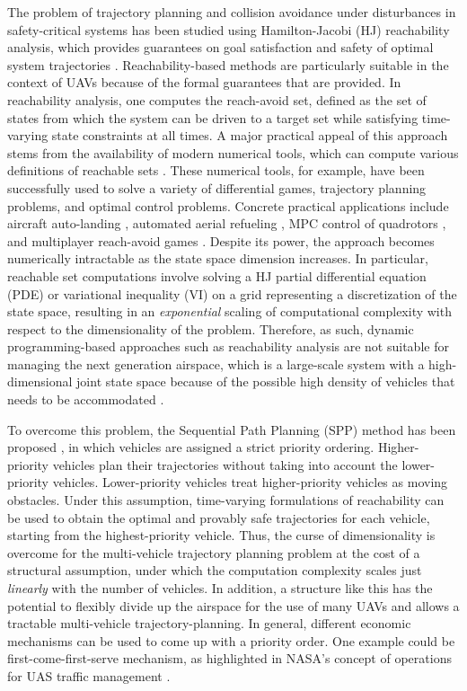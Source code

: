 The problem of trajectory planning and collision avoidance under disturbances in safety-critical systems has been studied using Hamilton-Jacobi (HJ) reachability analysis, which provides guarantees on goal satisfaction and safety of optimal system trajectories \cite{Barron90, Mitchell05, Bokanowski10, Bokanowski11, Margellos11, Fisac15}. Reachability-based methods are particularly suitable in the context of UAVs because of the formal guarantees that are provided. In reachability analysis, one computes the reach-avoid set, defined as the set of states from which the system can be driven to a target set while satisfying time-varying state constraints at all times. A major practical appeal of this approach stems from the availability of modern numerical tools, which can compute various definitions of reachable sets \cite{Sethian96, Osher02, Mitchell02, Mitchell07b}. These numerical tools, for example, have been successfully used to solve a variety of differential games, trajectory planning problems, and optimal control problems. Concrete practical applications include aircraft auto-landing \cite{Bayen07}, automated aerial refueling \cite{Ding08}, MPC control of quadrotors \cite{Bouffard12}, and multiplayer reach-avoid games \cite{Huang11}. Despite its power, the approach becomes numerically intractable as the state space dimension increases. In particular, reachable set computations involve solving a HJ partial differential equation (PDE) or variational inequality (VI) on a grid representing a discretization of the state space, resulting in an \textit{exponential} scaling of computational complexity with respect to the dimensionality of the problem. Therefore, as such, dynamic programming-based approaches such as reachability analysis are not suitable for managing the next generation airspace, which is a large-scale system with a high-dimensional joint state space because of the possible high density of vehicles that needs to be accommodated \cite{Kopardekar16}.  

To overcome this problem, the Sequential Path Planning (SPP) method has been proposed \cite{Chen15c}, in which vehicles are assigned a strict priority ordering. Higher-priority vehicles plan their trajectories without taking into account the lower-priority vehicles. Lower-priority vehicles treat higher-priority vehicles as moving obstacles. Under this assumption, time-varying formulations of reachability \cite{Bokanowski11, Fisac15} can be used to obtain the optimal and provably safe trajectories for each vehicle, starting from the highest-priority vehicle. Thus, the curse of dimensionality is overcome for the multi-vehicle trajectory planning problem at the cost of a structural assumption, under which the computation complexity scales just \textit{linearly} with the number of vehicles. In addition, a structure like this has the potential to flexibly divide up the airspace for the use of many UAVs and allows a tractable multi-vehicle trajectory-planning. In general, different economic mechanisms can be used to come up with a priority order. One example could be first-come-first-serve mechanism, as highlighted in NASA’s concept of operations for UAS traffic management \cite{Kopardekar16}. 

